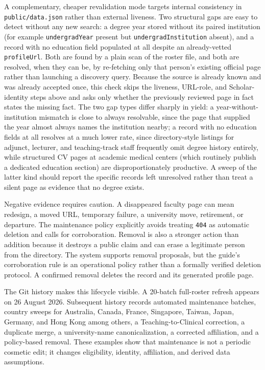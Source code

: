 \documentclass[11pt]{article}
\newcommand{\code}[1]{\texttt{\small #1}}
\begin{document}
A complementary, cheaper revalidation mode targets internal consistency in \code{public/data.json} rather than external liveness. Two structural gaps are easy to detect without any new search: a degree year stored without its paired institution (for example \code{undergradYear} present but \code{undergradInstitution} absent), and a record with no education field populated at all despite an already-vetted \code{profileUrl}. Both are found by a plain scan of the roster file, and both are resolved, when they can be, by re-fetching only that person's existing official page rather than launching a discovery query. Because the source is already known and was already accepted once, this check skips the liveness, URL-role, and Scholar-identity steps above and asks only whether the previously reviewed page in fact states the missing fact. The two gap types differ sharply in yield: a year-without-institution mismatch is close to always resolvable, since the page that supplied the year almost always names the institution nearby; a record with no education fields at all resolves at a much lower rate, since directory-style listings for adjunct, lecturer, and teaching-track staff frequently omit degree history entirely, while structured CV pages at academic medical centers (which routinely publish a dedicated education section) are disproportionately productive. A sweep of the latter kind should report the specific records left unresolved rather than treat a silent page as evidence that no degree exists.

Negative evidence requires caution.
A disappeared faculty page can mean redesign, a moved URL, temporary failure, a university move, retirement, or departure.
The maintenance policy explicitly avoids treating \code{404} as automatic deletion and calls for corroboration.
Removal is also a stronger action than addition because it destroys a public claim and can erase a legitimate person from the directory.
The system supports removal proposals, but the guide's corroboration rule is an operational policy rather than a formally verified deletion protocol. A confirmed removal deletes the record and its generated profile page.

The Git history makes this lifecycle visible.
A 20-batch full-roster refresh appears on 26 August 2026.
Subsequent history records automated maintenance batches, country sweeps for Australia, Canada, France, Singapore, Taiwan, Japan, Germany, and Hong Kong among others, a Teaching-to-Clinical correction, a duplicate merge, a university-name canonicalization, a corrected affiliation, and a policy-based removal.
These examples show that maintenance is not a periodic cosmetic edit; it changes eligibility, identity, affiliation, and derived data assumptions.
\end{document}
